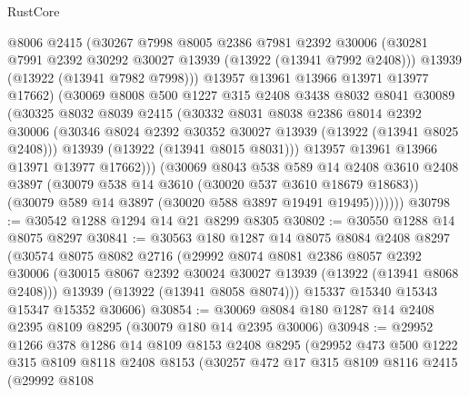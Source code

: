 \begin{lexlean}{RustCore}
\begin{coremodule}
                @8006
                @2415
                (@30267
                  @7998
                  @8005
                  @2386
                  @7981
                  @2392
                  @30006
                  (@30281 @7991 @2392 @30292 @30027 @13939 (@13922 (@13941 @7992 @2408)))
                  @13939
                  (@13922 (@13941 @7982 @7998)))
                @13957
                @13961
                @13966
                @13971
                @13977
                @17662)
              (@30069
                @8008
                @500
                @1227
                @315
                @2408
                @3438
                @8032
                @8041
                @30089
                (@30325
                  @8032
                  @8039
                  @2415
                  (@30332
                    @8031
                    @8038
                    @2386
                    @8014
                    @2392
                    @30006
                    (@30346 @8024 @2392 @30352 @30027 @13939 (@13922 (@13941 @8025 @2408)))
                    @13939
                    (@13922 (@13941 @8015 @8031)))
                  @13957
                  @13961
                  @13966
                  @13971
                  @13977
                  @17662)))
            (@30069
              @8043
              @538
              @589
              @14
              @2408
              @3610
              @2408
              @3897
              (@30079 @538 @14 @3610 (@30020 @537 @3610 @18679 @18683))
              (@30079 @589 @14 @3897 (@30020 @588 @3897 @19491 @19495)))))))
@30798 := @30542 @1288 @1294 @14 @21 @8299 @8305
@30802 := @30550 @1288 @14 @8075 @8297
@30841 := @30563
    @180
    @1287
    @14
    @8075
    @8084
    @2408
    @8297
    (@30574
      @8075
      @8082
      @2716
      (@29992
        @8074
        @8081
        @2386
        @8057
        @2392
        @30006
        (@30015 @8067 @2392 @30024 @30027 @13939 (@13922 (@13941 @8068 @2408)))
        @13939
        (@13922 (@13941 @8058 @8074)))
      @15337
      @15340
      @15343
      @15347
      @15352
      @30606)
@30854 := @30069 @8084 @180 @1287 @14 @2408 @2395 @8109 @8295 (@30079 @180 @14 @2395 @30006)
@30948 := @29952
    @1266
    @378
    @1286
    @14
    @8109
    @8153
    @2408
    @8295
    (@29952
      @473
      @500
      @1222
      @315
      @8109
      @8118
      @2408
      @8153
      (@30257
        @472
        @17
        @315
        @8109
        @8116
        @2415
        (@29992
          @8108

\end{coremodule}
\end{lexlean}

